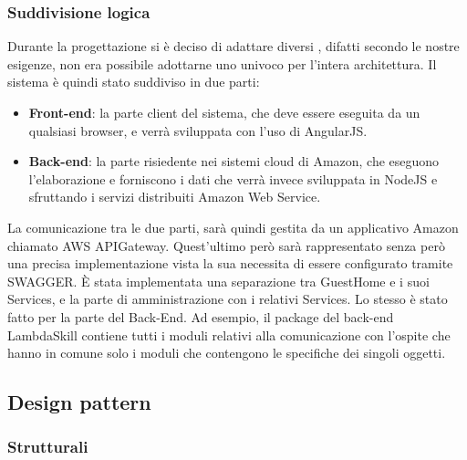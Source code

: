 \documentclass[../DefinizioneDiProdotto_v3.0.0.tex]{subfiles}
\begin{document}
\subsubsection{Suddivisione logica}
Durante la progettazione si è deciso di adattare diversi ,
difatti secondo le nostre esigenze, non era possibile adottarne uno univoco per l'intera architettura.
Il sistema è quindi stato suddiviso in due parti:
\begin{itemize}
	\item \textbf{Front-end}: la parte client del sistema, che deve essere eseguita da un qualsiasi browser, e verrà sviluppata con l'uso di AngularJS.
	\item \textbf{Back-end}: la parte risiedente nei sistemi cloud di Amazon, che eseguono l'elaborazione e forniscono i dati che verrà invece sviluppata in NodeJS e sfruttando i servizi distribuiti Amazon Web Service.
\end{itemize}
La comunicazione tra le due parti, sarà quindi gestita da un applicativo Amazon chiamato AWS APIGateway. Quest'ultimo però sarà rappresentato senza però una precisa implementazione vista la sua necessita di essere configurato tramite SWAGGER.
È stata implementata una separazione tra GuestHome e i suoi Services, e la parte di amministrazione con i relativi Services. Lo stesso è stato fatto per la parte del Back-End. Ad esempio, il package del back-end LambdaSkill contiene tutti i moduli relativi alla comunicazione con l'ospite che hanno in comune solo i moduli che contengono le specifiche dei singoli oggetti.

\subsection{Design pattern}

\subsubsection{Strutturali}
\end{document}
